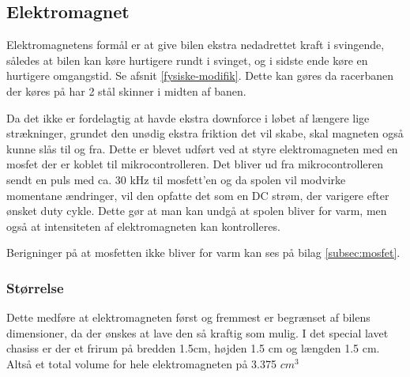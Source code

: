 
\subsection{Elektromagnet}
\label{Elektromagnet}


Elektromagnetens formål er at give bilen ekstra nedadrettet kraft i svingende, således at bilen kan køre hurtigere rundt i svinget, og i sidste ende køre en hurtigere omgangstid. Se afsnit \ref{fysiske-modifik}. Dette kan gøres da racerbanen der køres på har 2 stål skinner i midten af banen.

Da det ikke er fordelagtig at havde ekstra downforce i løbet af længere lige strækninger, grundet den unødig ekstra friktion det vil skabe, skal magneten også kunne slås til og fra. Dette er blevet udført ved at styre elektromagneten med en mosfet der er koblet til mikrocontrolleren. Det bliver ud fra mikrocontrolleren sendt en puls med ca. 30 kHz til mosfett’en og da spolen vil modvirke momentane ændringer, vil den opfatte det som en DC strøm, der varigere efter ønsket duty cykle. Dette gør at man kan undgå at spolen bliver for varm, men også at intensiteten af elektromagneten kan kontrolleres.

Berigninger på at mosfetten ikke bliver for varm kan ses på bilag \ref{subsec:mosfet}.

\subsubsection{Størrelse}

Dette medføre at elektromagneten først og fremmest er begrænset af bilens dimensioner, da der ønskes at lave den så kraftig som mulig. I det special lavet chasiss er der et frirum på bredden 1.5cm, højden 1.5 cm og længden 1.5 cm. Altså et total volume for hele elektromagneten på 3.375 $cm^3$

